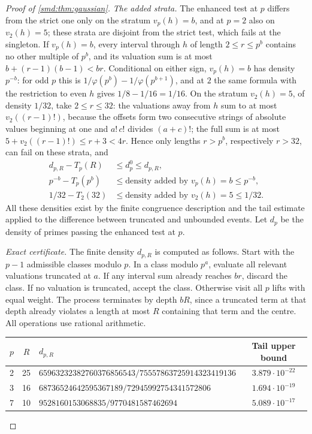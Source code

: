 \begin{proof}[Proof of \cref{smd:thm:gaussian}]
\emph{The added strata.} The enhanced test at $p$ differs from the strict one only on the
stratum $v_p(h)=b$, and at $p=2$ also on $v_2(h)=5$; these strata are disjoint from the
strict test, which fails at the singleton. If $v_p(h)=b$, every interval through $h$ of
length $2\le r\le p^b$ contains no other multiple of $p^b$, and its valuation sum is at most
$b+(r-1)(b-1)<br$. Conditional on either sign, $v_p(h)=b$ has density $p^{-b}$: for odd $p$
this is $1/\varphi(p^b)-1/\varphi(p^{b+1})$, and at $2$ the same formula with the
restriction to even $h$ gives $1/8-1/16=1/16$. On the stratum $v_2(h)=5$, of density
$1/32$, take $2\le r\le32$: the valuations away from $h$ sum to at most $v_2((r-1)!)$,
because the offsets form two consecutive strings of absolute values beginning at one and
$a!\,c!$ divides $(a+c)!$; the full sum is at most $5+v_2((r-1)!)\le r+3<4r$. Hence only
lengths $r>p^b$, respectively $r>32$, can fail on these strata, and
\begin{align*}
 d_{p,R}-T_p(R)&\le d_p^0\le d_{p,R},\\
 p^{-b}-T_p(p^b)&\le\text{density added by }v_p(h)=b\le p^{-b},\\
 1/32-T_2(32)&\le\text{density added by }v_2(h)=5\le1/32 .
\end{align*}
All these densities exist by the finite congruence description and the tail estimate
applied to the difference between truncated and unbounded events. Let $d_p$ be the density
of primes passing the enhanced test at $p$.

\emph{Exact certificate.} The finite density $d_{p,R}$ is computed as follows. Start with
the $p-1$ admissible classes modulo $p$. In a class
modulo $p^a$, evaluate all relevant valuations truncated at $a$. If any interval sum already
reaches $br$, discard the class. If no valuation is truncated, accept the class. Otherwise
visit all $p$ lifts with equal weight. The process terminates by depth $bR$, since a
truncated term at that depth already violates a length at most $R$ containing that term
and the centre. All operations use rational arithmetic.
\begin{center}
\begin{tabular}{cclc}
\toprule
$p$ & $R$ & $d_{p,R}$ & Tail upper bound\\
\midrule
2&25&$65963232382760376856543/75557863725914323419136$ &$3.879\cdot10^{-22}$\\
3&16&$68736524642595367189/72945992754341572806$ &$1.694\cdot10^{-19}$\\
7&10&$9528160153068835/9770481587462694$ &$5.089\cdot10^{-17}$\\
\bottomrule
\end{tabular}
\end{center}


\end{proof}
